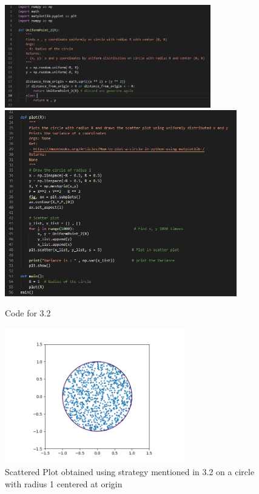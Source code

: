 \documentclass[answers]{exam}
\begin{document}
\begin{framed}
 \begin{figure}[H] %
    \centering
    \includegraphics[width= 0.8\textwidth]{Q3.2_code_1.PNG}
     \includegraphics[width= 0.9\textwidth]{Q3.2_code_2.PNG}
     \caption{Code for 3.2}
    \end{figure}
    
    \begin{figure}[H] %
    \centering
    \includegraphics[width= 0.7\textwidth]{Q3.2_histogram.png}
    \caption{Scattered Plot obtained using strategy mentioned in 3.2 on a circle with radius 1 centered at origin}
    \end{figure}
    

\end{framed}
\end{document}
